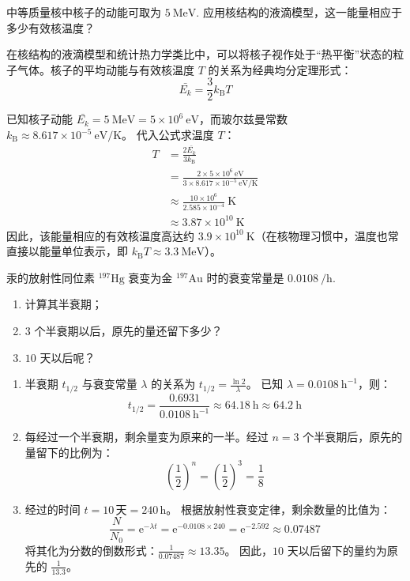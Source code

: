\begin{exercise}\label{ex:29.12}
中等质量核中核子的动能可取为 $5 \ \mathrm{MeV}$. 应用核结构的液滴模型，这一能量相应于多少有效核温度？
\end{exercise}
\begin{solution}
在核结构的液滴模型和统计热力学类比中，可以将核子视作处于“热平衡”状态的粒子气体。核子的平均动能与有效核温度 $T$ 的关系为经典均分定理形式：
$$ \bar{E_k} = \frac{3}{2} k_{\mathrm{B}} T $$

已知核子动能 $\bar{E_k} = 5 \ \mathrm{MeV} = 5 \times 10^6 \ \mathrm{eV}$，而玻尔兹曼常数 $k_{\mathrm{B}} \approx 8.617 \times 10^{-5} \ \mathrm{eV/K}$。
代入公式求温度 $T$：
\[
\begin{aligned}
T &= \frac{2 \bar{E_k}}{3 k_{\mathrm{B}}}\\
  &= \frac{2 \times 5 \times 10^6 \ \mathrm{eV}}{3 \times 8.617 \times 10^{-5} \ \mathrm{eV/K}}\\
  &\approx \frac{10 \times 10^6}{2.585 \times 10^{-4}} \ \mathrm{K}\\
  &\approx 3.87 \times 10^{10} \ \mathrm{K}
\end{aligned}
\]
因此，该能量相应的有效核温度高达约 $3.9 \times 10^{10} \ \mathrm{K}$（在核物理习惯中，温度也常直接以能量单位表示，即 $k_{\mathrm{B}} T \approx 3.3 \ \mathrm{MeV}$）。
\end{solution}

\begin{exercise}\label{ex:29.13}
汞的放射性同位素 $^{197}\mathrm{Hg}$ 衰变为金 $^{197}\mathrm{Au}$ 时的衰变常量是 $0.0108 \ \mathrm{/h}$. 
\begin{enumerate}
  \item[(a)] 计算其半衰期；
  \item[(b)] $3$ 个半衰期以后，原先的量还留下多少？
  \item[(c)] $10$ 天以后呢？
\end{enumerate}
\end{exercise}
\begin{solution}
\begin{enumerate}
    \item[(a)] 半衰期 $t_{1/2}$ 与衰变常量 $\lambda$ 的关系为 $t_{1/2} = \frac{\ln 2}{\lambda}$。
    已知 $\lambda = 0.0108 \ \mathrm{h^{-1}}$，则：
    $$ t_{1/2} = \frac{0.6931}{0.0108 \ \mathrm{h^{-1}}} \approx 64.18 \ \mathrm{h} \approx 64.2 \ \mathrm{h} $$
    
    \item[(b)] 每经过一个半衰期，剩余量变为原来的一半。经过 $n=3$ 个半衰期后，原先的量留下的比例为：
    $$ \left( \frac{1}{2} \right)^n = \left( \frac{1}{2} \right)^3 = \frac{1}{8} $$
    
    \item[(c)] 经过的时间 $t = 10\,\text{天} = 240\,\mathrm{h}$。
    根据放射性衰变定律，剩余数量的比值为：
    $$ \frac{N}{N_0} = \mathrm{e}^{-\lambda t} = \mathrm{e}^{-0.0108 \times 240} = \mathrm{e}^{-2.592} \approx 0.07487 $$
    将其化为分数的倒数形式：$\frac{1}{0.07487} \approx 13.35$。
    因此，$10$ 天以后留下的量约为原先的 $\frac{1}{13.3}$。
\end{enumerate}
\end{solution}

